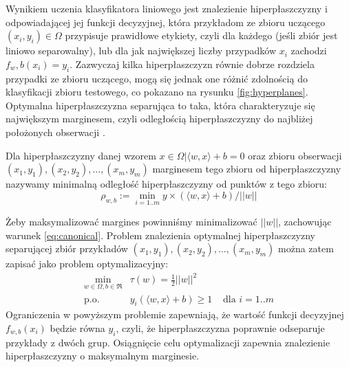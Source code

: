 Wynikiem uczenia klasyfikatora liniowego jest znalezienie hiperpłaszczyzny i odpowiadającej jej funkcji decyzyjnej, która przykładom ze zbioru uczącego $ (x_i, y_i) \in \Omega $ przypisuje prawidłowe etykiety, czyli dla każdego (jeśli zbiór jest liniowo separowalny), lub dla jak największej liczby przypadków $ x_i $ zachodzi  $ f_w,b(x_i) = y_i $. Zazwyczaj kilka hiperpłaszczyzn równie dobrze rozdziela przypadki ze zbioru uczącego, mogą się jednak one różnić zdolnością do klasyfikacji zbioru testowego, co pokazano na rysunku \ref{fig:hyperplanes}. Optymalna hiperpłaszczyzna separująca to taka, która charakteryzuje się największym marginesem, czyli odległością hiperpłaszczyzny do najbliżej położonych obserwacji \cite{scholkopf_learning_2002}.
\begin{definicjaa}
Dla hiperpłaszczyzny danej wzorem $ { x \in \Omega | \langle w, x \rangle + b = 0} $ oraz zbioru obserwacji\\
 $ {(x_1, y_1), (x_2, y_2), ..., (x_m, y_m)} $ marginesem tego zbioru od hiperpłaszczyzny nazywamy minimalną odległość hiperpłaszczyzny od punktów z tego zbioru:
	\begin{equation}
	\rho_{w,b} := \min_{i=1..m} y \times (\langle w, x \rangle + b) / ||w||
	\label{eq:margin}
	\end{equation}
	
\end{definicjaa}
Żeby maksymalizować margines powinniśmy minimalizować $ ||w|| $, zachowując warunek \ref{eq:canonical}. Problem znalezienia optymalnej hiperpłaszczyzny separującej zbiór przykładów  $ {(x_1, y_1), (x_2, y_2), ..., (x_m, y_m)} $ można zatem zapisać jako problem optymalizacyjny:
\begin{equation}
\begin{array}{lll}
\min\limits_{w \in \Omega, b \in \Re} &  \tau(w) = \frac{1}{2}||w||^2 & \\
\text{p.o.} &  y_i  (\langle w, x \rangle + b) \geq 1 & \text{ dla } i=1..m
\end{array}
\label{eq:primal}
\end{equation}
Ograniczenia w powyższym problemie zapewniają, że wartość funkcji decyzyjnej $ f_{w,b}(x_i) $ będzie równa $  y_i $, czyli, że hiperpłaszczyzna poprawnie odseparuje przykłady z dwóch grup. Osiągnięcie celu optymalizacji zapewnia znalezienie hiperpłaszczyzny o maksymalnym marginesie.

